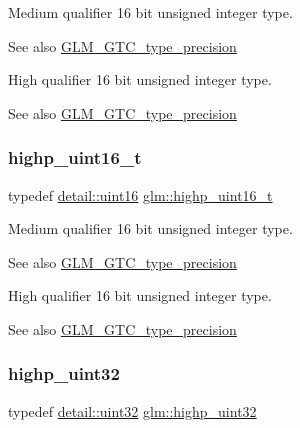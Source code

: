 Medium qualifier 16 bit unsigned integer type. \begin{DoxySeeAlso}{See also}
\mbox{\hyperlink{group__gtc__type__precision}{G\+L\+M\+\_\+\+G\+T\+C\+\_\+type\+\_\+precision}}
\end{DoxySeeAlso}
High qualifier 16 bit unsigned integer type. \begin{DoxySeeAlso}{See also}
\mbox{\hyperlink{group__gtc__type__precision}{G\+L\+M\+\_\+\+G\+T\+C\+\_\+type\+\_\+precision}} 
\end{DoxySeeAlso}
\mbox{\label{group__gtc__type__precision_ga3145bc0ee80432c165e985a188a722b3}} 
\subsubsection{\texorpdfstring{highp\+\_\+uint16\+\_\+t}{highp\_uint16\_t}}
{\footnotesize\ttfamily typedef \mbox{\hyperlink{namespaceglm_1_1detail_a47b2a7d006d187338e8031a352d1ce56}{detail\+::uint16}} \mbox{\hyperlink{group__gtc__type__precision_ga3145bc0ee80432c165e985a188a722b3}{glm\+::highp\+\_\+uint16\+\_\+t}}}

Medium qualifier 16 bit unsigned integer type. \begin{DoxySeeAlso}{See also}
\mbox{\hyperlink{group__gtc__type__precision}{G\+L\+M\+\_\+\+G\+T\+C\+\_\+type\+\_\+precision}}
\end{DoxySeeAlso}
High qualifier 16 bit unsigned integer type. \begin{DoxySeeAlso}{See also}
\mbox{\hyperlink{group__gtc__type__precision}{G\+L\+M\+\_\+\+G\+T\+C\+\_\+type\+\_\+precision}} 
\end{DoxySeeAlso}
\mbox{\label{group__gtc__type__precision_ga3145e44c73e2df7dfe4f3cb65974bf22}} 
\subsubsection{\texorpdfstring{highp\+\_\+uint32}{highp\_uint32}}
{\footnotesize\ttfamily typedef \mbox{\hyperlink{namespaceglm_1_1detail_ade6cfbf377022aaa391af8cd50489222}{detail\+::uint32}} \mbox{\hyperlink{group__gtc__type__precision_ga3145e44c73e2df7dfe4f3cb65974bf22}{glm\+::highp\+\_\+uint32}}}

